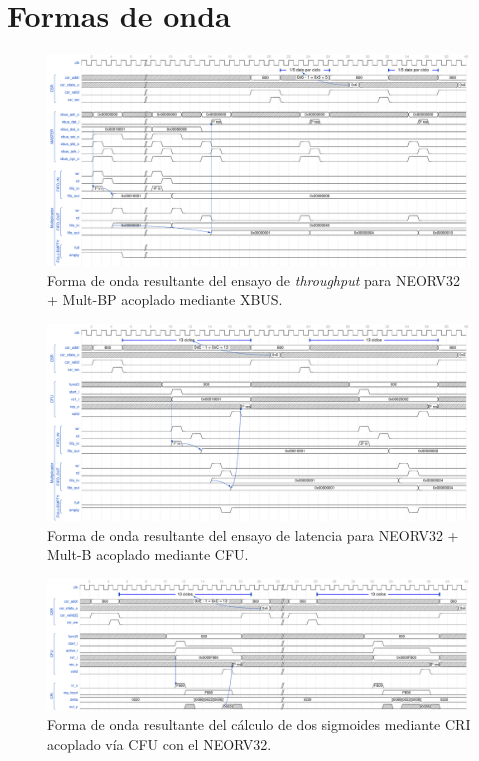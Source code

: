 
\chapter{Formas de onda} %

\label{wave} 

\begin{figure}[h!]
    \centering
    \includegraphics[width=17cm,angle=90]{Figuras/wave-xbus.pdf}
    \caption{Forma de onda resultante del ensayo de \textit{throughput} para NEORV32 + Mult-BP acoplado mediante XBUS.}
    \label{wave:xbus}
\end{figure}

\newpage

\begin{figure}[h!]
    \centering
    \includegraphics[width=22cm,angle=90]{Figuras/wave-cfu.pdf}
    \caption{Forma de onda resultante del ensayo de latencia para NEORV32 + Mult-B acoplado mediante CFU.}
    \label{wave:cfu}
\end{figure}

\newpage

\begin{figure}[h!]
    \centering
    \includegraphics[width=22cm,angle=90]{Figuras/wave-sig.pdf}
    \caption{Forma de onda resultante del cálculo de dos sigmoides mediante CRI acoplado vía CFU con el NEORV32.}
    \label{wave:sig}
\end{figure}
